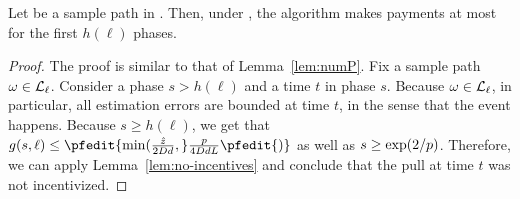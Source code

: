 \begin{lemma} \label{lem:envelope-payments}
Let \SP be a sample path in \Env{\ell}.
Then, under \SP, the algorithm makes payments at most for the first 
$h(\ell)$ phases. 
\end{lemma}

\begin{proof}
The proof is similar to that of Lemma~\ref{lem:numP}.
Fix a sample path $\omega \in {\mathcal L}_{\ell}$.
Consider a phase $s > h(\ell)$ and a time $t$ in phase $s$.
Because $\omega \in {\mathcal L}_{\ell}$, in particular, all estimation errors are
bounded at time $t$, in the sense that the event 
happens.
Because $s \geq h(\ell)$, we get that
$g(s,\ell) \leq \pfedit{\min(\frac{\TieCutoff}{2\Diam d},} \frac{\MinProb}{4 \Diam d \TieDensity}\pfedit{)}$
as well as $s \geq \exp(2/p)$.
Therefore, we can apply Lemma~\ref{lem:no-incentives} and conclude
that the pull at time $t$ was not incentivized.
\end{proof}

